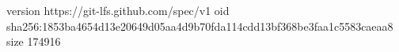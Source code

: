 version https://git-lfs.github.com/spec/v1
oid sha256:1853ba4654d13e20649d05aa4d9b70fda114cdd13bf368be3faa1c5583caeaa8
size 174916
